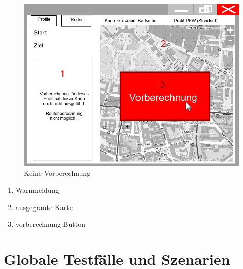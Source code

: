 \documentclass[a4paper, 11pt]{article}
\begin{document}
\begin{figure}[H]
\centering
\includegraphics[width=0.7\linewidth]{mockup_screenshot_nicht_berechnet}
\caption{Keine Vorberechnung}
\label{fig:mockupscreenshotkeinevorberechnung}
\end{figure}
\begin{enumerate}
\item Warnmeldung
\item ausgegraute Karte
\item \gls{vorberechnung}-Button
\end{enumerate}

\section{Globale Testfälle und Szenarien}
\end{document}
